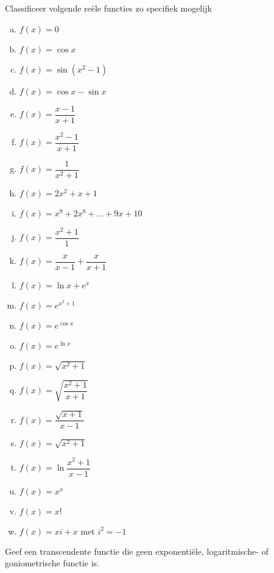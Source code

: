 \documentclass[12pt]{article}
\begin{document}
\begin{oefening}
Classificeer volgende reële functies zo specifiek mogelijk
\begin{multicols}{2}
  \begin{enumerate}[(a)]
    \itemsep1em
    \item $\displaystyle f(x)=0$
    \item $\displaystyle f(x)=\cos x$
    \item $\displaystyle f(x)=\sin(x^2-1)$
    \item $\displaystyle f(x)=\cos x - \sin x$
    \item $\displaystyle f(x)=\dfrac{x-1}{x+1}$
    \item $\displaystyle f(x)=\dfrac{x^2-1}{x+1}$
    \item $\displaystyle f(x)=\dfrac{1}{x^2+1}$
    \item $\displaystyle f(x)=2x^2+x+1$
    \item $\displaystyle f(x)=x^{9}+2x^{8}+\ldots+9x+10$
    \item $\displaystyle f(x)=\dfrac{x^2+1}{1}$
    \item $\displaystyle f(x)=\dfrac{x}{x-1}+\dfrac{x}{x+1}$
    \item $\displaystyle f(x)=\ln x + e^x$
    \item $\displaystyle f(x)=e^{x^2+1}$
    \item $\displaystyle f(x)=e^{\cos x}$
    \item $\displaystyle f(x)=e^{\ln x}$
    \item $\displaystyle f(x)=\sqrt{x^2+1}$
    \item $\displaystyle f(x)=\sqrt{\dfrac{x^2+1}{x+1}}$
    \item $\displaystyle f(x)=\dfrac{\sqrt{x+1}}{x-1}$
    \item $\displaystyle f(x)=\sqrt{x^2+1}$
    \item $\displaystyle f(x)=\ln \dfrac{x^2+1}{x-1}$
    \item $\displaystyle f(x)=x^x$
    \item $\displaystyle f(x)=x!$
    \item $\displaystyle f(x)=xi+x \mbox{ met } i^2=-1$
  \end{enumerate}
\end{multicols}
\end{oefening}

\begin{oefening}
Geef een transcendente functie die geen exponentiële, logaritmische- of goniometrische functie is.
\end{oefening}
\end{document}
